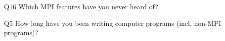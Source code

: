 \begin{description}%
\item{Q16} Which MPI features have you never heard of?%
\item{Q5} How long have you been writing computer programs (incl. non-MPI programs)?%
\end{description}%
